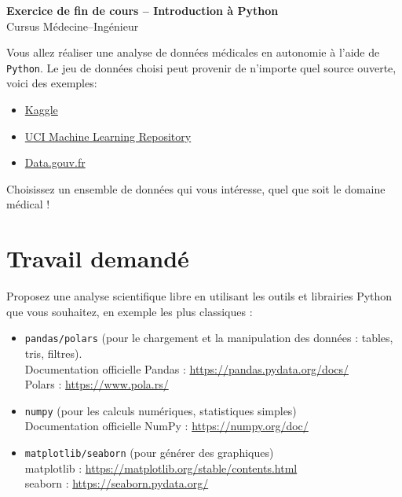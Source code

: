 \documentclass[12pt,a4paper]{article}
\begin{document}
\begin{center}
\Large \textbf{Exercice de fin de cours – Introduction à Python}\\[0.5em]
\small Cursus Médecine–Ingénieur
\end{center}

Vous allez réaliser une analyse de données médicales en autonomie à l’aide de \texttt{Python}.  
Le jeu de données choisi peut provenir de n'importe quel source ouverte, voici des exemples:
\begin{itemize}
    \item \href{https://www.kaggle.com/datasets}{Kaggle}
    \item \href{https://archive.ics.uci.edu/datasets}{UCI Machine Learning Repository}
    \item \href{https://data.gouv.fr/}{Data.gouv.fr}
\end{itemize}
Choisissez un ensemble de données qui vous intéresse, quel que soit le domaine médical !  

\section*{Travail demandé}

Proposez une analyse scientifique libre en utilisant les outils et librairies Python que vous souhaitez, en exemple les plus classiques :
\begin{itemize}
    \item \texttt{pandas/polars} (pour le chargement et la manipulation des données : tables, tris, filtres). \\
          Documentation officielle Pandas : \href{https://pandas.pydata.org/docs/}{https://pandas.pydata.org/docs/} \\
          Polars : \href{https://www.pola.rs/}{https://www.pola.rs/}
    \item \texttt{numpy} (pour les calculs numériques, statistiques simples) \\
          Documentation officielle NumPy : \href{https://numpy.org/doc/}{https://numpy.org/doc/}
    \item \texttt{matplotlib/seaborn} (pour générer des graphiques) \\
          matplotlib : \href{https://matplotlib.org/stable/contents.html}{https://matplotlib.org/stable/contents.html} \\
          seaborn : \href{https://seaborn.pydata.org/}{https://seaborn.pydata.org/}
\end{itemize}
\end{document}
